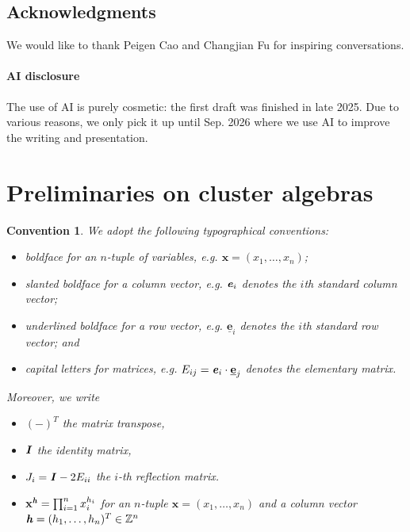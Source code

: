 \documentclass[11pt,reqno]{amsart}
\theoremstyle{plain}
\newtheorem{convention}[theorem]{Convention}
\theoremstyle{definition}
\numberwithin{equation}{section}
\newcommand\ZZ{\mathbb{Z}}
\newcommand\<{\langle}
\renewcommand\>{\rangle}
\newcommand{\bfit}[1]{\textbf{\textit{#1}}}
\newcommand{\ubf}[1]{\underline{\mathbf{#1}}}
\def\xx{\mathbf{x}}%
\begin{document}
\subsection*{Acknowledgments}
We would like to thank Peigen Cao and Changjian Fu for inspiring conversations.
\paragraph{\textbf{AI disclosure}}
The use of AI is purely cosmetic:
the first draft was finished in late 2025. 
Due to various reasons, we only pick it up until Sep. 2026 where we use AI to improve the writing and presentation.


\section{Preliminaries on cluster algebras}\label{sec:preCA}

\begin{convention}\label{conv:eE}
We adopt the following typographical conventions:
\begin{itemize}
    \item 
    boldface for an $n$-tuple of variables, e.g. $\xx=(x_1,\ldots,x_n)$;
    \item slanted boldface for a column vector, e.g. $\bfit{e}_i$ denotes the $i$th standard column vector;
    \item underlined boldface for a row vector, e.g. $\ubf{e}_i$ denotes the $i$th standard row vector; and
    \item 
    capital letters for matrices, e.g. $E_{ij}=\bfit{e}_i\cdot\ubf{e}_j$ denotes the elementary matrix.
\end{itemize}
Moreover, we write
\begin{itemize}
    \item $(-)^T$ the matrix transpose,
    \item $\bfit{I}$ the identity matrix,
    \item $J_i=\bfit{I} - 2E_{ii}$ the $i$-th reflection matrix.
    \item $\xx^\bfit{h}=\prod_{i=1}^n x_i^{h_i}$ for an $n$-tuple $\xx=(x_1,\ldots,x_n)$ and a column vector $\bfit{h}=(h_1,\ldots,h_n)^T\in\ZZ^{n}$
\end{itemize}
\end{convention}
\end{document}
